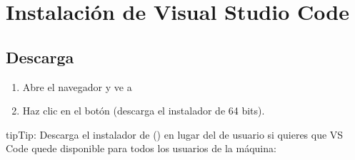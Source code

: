 \documentclass[letterpaper,10pt,english]{sphinxmanual}
\begin{document}
\sphinxstepscope


\chapter{Instalación de Visual Studio Code}
\label{\detokenize{vscode:instalacion-de-visual-studio-code}}\label{\detokenize{vscode:vscode}}\label{\detokenize{vscode::doc}}

\section{Descarga}
\label{\detokenize{vscode:descarga}}\begin{enumerate}
%
\item {} 
\sphinxAtStartPar
Abre el navegador y ve a 

\item {} 
\sphinxAtStartPar
Haz clic en el botón  (descarga el instalador  de 64 bits).

\end{enumerate}

\begin{sphinxadmonition}{tip}{Tip:}
\sphinxAtStartPar
Descarga el instalador de  () en lugar del
de usuario si quieres que VS Code quede disponible para todos los usuarios
de la máquina:
\end{sphinxadmonition}
\end{document}
